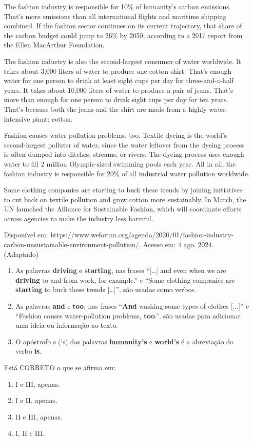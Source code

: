 The fashion industry is responsible for 10\% of humanity’s carbon emissions. That’s more emissions than all international flights and maritime shipping combined. If the fashion sector continues on its current trajectory, that share of the carbon budget could jump to 26\% by 2050, according to a 2017 report from the Ellen MacArthur Foundation.

The fashion industry is also the second-largest consumer of water worldwide. It takes about 3,000 liters of water to produce one cotton shirt. That’s enough water for one person to drink at least eight cups per day for three-and-a-half years. It takes about 10,000 liters of water to produce a pair of jeans. That’s more than enough for one person to drink eight cups per day for ten years. That’s because both the jeans and the shirt are made from a highly water-intensive plant: cotton.

Fashion causes water-pollution problems, too. Textile dyeing is the world’s second-largest polluter of water, since the water leftover from the dyeing process is often dumped into ditches, streams, or rivers. The dyeing process uses enough water to fill 2 million Olympic-sized swimming pools each year. All in all, the fashion industry is responsible for 20\% of all industrial water pollution worldwide.

Some clothing companies are starting to buck these trends by joining initiatives to cut back on textile pollution and grow cotton more sustainably. In March, the UN launched the Alliance for Sustainable Fashion, which will coordinate efforts across agencies to make the industry less harmful.

\noindent Disponível em: https://www.weforum.org/agenda/2020/01/fashion-industry-carbon-unsustainable-environment-pollution/. Acesso em: 4 ago. 2024. (Adaptado)

\begin{enumerate}
\item[I.] As palavras \textbf{driving} e \textbf{starting}, nas frases “[…] and even when we are \textbf{driving} to and from work, for example.” e “Some clothing companies are \textbf{starting} to buck these trends […]”, são usadas como verbos.
\item[II.] As palavras \textbf{and} e \textbf{too}, nas frases “\textbf{And} washing some types of clothes [...]” e “Fashion causes water-pollution problems, \textbf{too}.”, são usadas para adicionar uma ideia ou informação ao texto.
\item[III.] O apóstrofo s (‘s) das palavras \textbf{humanity’s} e \textbf{world’s} é a abreviação do verbo \textbf{is}.
\end{enumerate}
Está CORRETO o que se afirma em:
\begin{enumerate}
\item I e III, apenas.
\item I e II, apenas.
\item II e III, apenas.
\item I, II e III.
\end{enumerate}
